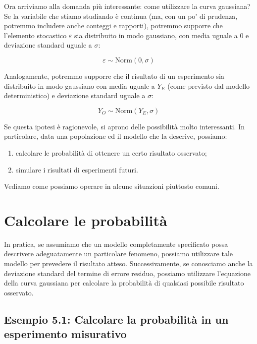 \documentclass[
  12pt,
]{book}
\providecommand{\tightlist}{%
  \setlength{\itemsep}{0pt}\setlength{\parskip}{0pt}}
\begin{document}
Ora arriviamo alla domanda più interessante: come utilizzare la curva gaussiana? Se la variabile che stiamo studiando è continua (ma, con un po' di prudenza, potremmo includere anche conteggi e rapporti), potremmo supporre che l'elemento stocastico \(\varepsilon\) sia distribuito in modo gaussiano, con media uguale a 0 e deviazione standard uguale a \(\sigma\):

\[\varepsilon \sim \textrm{Norm}(0, \sigma)\]

Analogamente, potremmo supporre che il risultato di un esperimento sia distribuito in modo gaussiano con media uguale a \(Y_E\) (come previsto dal modello deterministico) e deviazione standard uguale a \(\sigma\):

\[Y_O \sim \textrm{Norm}(Y_E, \sigma)\]

Se questa ipotesi è ragionevole, si aprono delle possibilità molto interessanti. In particolare, data una popolazione ed il modello che la descrive, possiamo:

\begin{enumerate}
\def\labelenumi{\arabic{enumi}.}
\tightlist
\item
  calcolare le probabilità di ottenere un certo risultato osservato;
\item
  simulare i risultati di esperimenti futuri.
\end{enumerate}

Vediamo come possiamo operare in alcune situazioni piuttosto comuni.

\hypertarget{calcolare-le-probabilituxe0}{%
\section{Calcolare le probabilità}\label{calcolare-le-probabilituxe0}}

In pratica, se assumiamo che un modello completamente specificato possa descrivere adeguatamente un particolare fenomeno, possiamo utilizzare tale modello per prevedere il risultato atteso. Successivamente, se conosciamo anche la deviazione standard del termine di errore residuo, possiamo utilizzare l'equazione della curva gaussiana per calcolare la probabilità di qualsiasi possibile risultato osservato.

\hypertarget{esempio-5.1-calcolare-la-probabilituxe0-in-un-esperimento-misurativo}{%
\subsection{Esempio 5.1: Calcolare la probabilità in un esperimento misurativo}\label{esempio-5.1-calcolare-la-probabilituxe0-in-un-esperimento-misurativo}}
\end{document}
